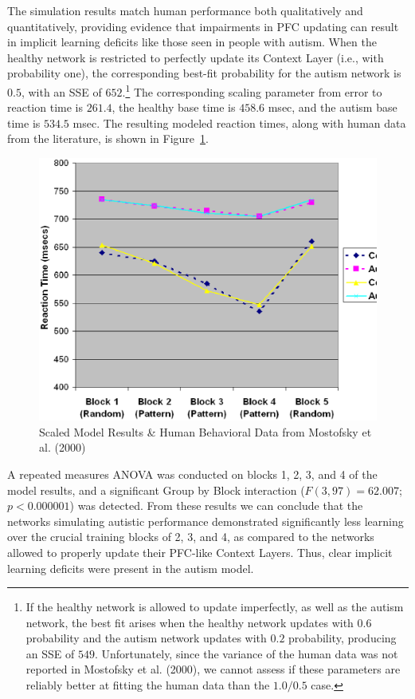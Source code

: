 The simulation results match human performance both qualitatively and quantitatively, providing evidence that impairments in PFC updating can result in implicit learning deficits like those seen in people with autism.  When the healthy network is restricted to perfectly update its Context Layer (i.e., with probability one), the corresponding best-fit probability for the autism network is $0.5$, with an SSE of $652$.\footnote{If the healthy network is allowed to update imperfectly, as well as the autism network, the best fit arises when the healthy network updates with $0.6$ probability and the autism network updates with $0.2$ probability, producing an SSE of $549$.  Unfortunately, since the variance of the human data was not reported in Mostofsky et al. (2000), we cannot assess if these parameters are reliably better at fitting the human data than the $1.0/0.5$ case.} The corresponding scaling parameter from error to reaction time is $261.4$, the healthy base time is $458.6$ msec, and the autism base time is $534.5$ msec.  The resulting modeled reaction times, along with human data from the literature, is shown in Figure~\ref{Model-Results}.

\begin{figure}[t]
\begin{center}
	\includegraphics[width=115mm]{graphs/srtt_chart.ps}
\end{center}
\caption{Scaled Model Results \& Human Behavioral Data from Mostofsky
         et al. (2000)} 
\label{Model-Results}
\end{figure} 

A repeated measures ANOVA was conducted on blocks 1, 2, 3, and 4 of the model results, and a significant Group by Block interaction ($F(3, 97) = 62.007$; $p < 0.000001$) was detected. From these results we can conclude that the networks simulating autistic performance demonstrated significantly less learning over the crucial training blocks of 2, 3, and 4, as compared to the networks allowed to properly update their PFC-like Context Layers.  Thus, clear implicit learning deficits were present in the autism model.

